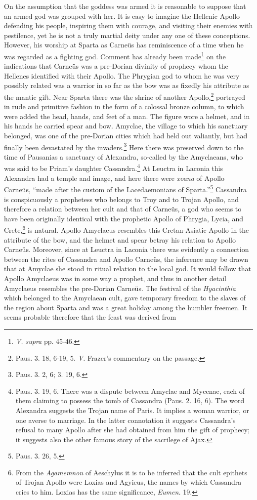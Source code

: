 \documentclass[a4paper, 12pt, oneside]{article}
\begin{document}
On the assumption that the goddess was armed it is reasonable to suppose that an armed god was grouped with her. It is easy to imagine the Hellenic Apollo defending his people, inspiring them with courage, and visiting their enemies with pestilence, yet he is not a truly martial deity under any one of these conceptions. However, his worship at Sparta as Carneüs has reminiscence of a time when he was regarded as a fighting god. Comment has already been made\footnote{\emph{V. supra} pp. 45-46.} on the indications that Carneüs was a pre-Dorian divinity of prophecy whom the Hellenes identified with their Apollo. The Phrygian god to whom he was very possibly related was a warrior in so far as the bow was as fixedly his attribute as the mantic gift. Near Sparta there was the shrine of another Apollo,\footnote{Paus. 3. 18, 6-19, 5. \emph{V.} Frazer's commentary on the passage.} portrayed in rude and primitive fashion in the form of a colossal bronze column, to which were added the head, hands, and feet of a man. The figure wore a helmet, and in his hands he carried spear and bow. Amyclae, the village to which his sanctuary belonged, was one of the pre-Dorian cities which had held out valiantly, but had finally been devastated by the invaders.\footnote{Paus. 3. 2, 6; 3. 19, 6.} Here there was preserved down to the time of Pausanias a sanctuary of Alexandra, so-called by the Amyclaeans, who was said to be Priam's daughter Cassandra.\footnote{Paus. 3. 19, 6. There was a dispute between Amyclae and Mycenae, each of them claiming to possess the tomb of Cassandra (Paus. 2. 16, 6). The word Alexandra suggests the Trojan name of Paris. It implies a woman warrior, or one averse to marriage. In the latter connotation it suggests Cassandra's refusal to many Apollo after she had obtained from him the gift of prophecy; it suggests also the other famous story of the sacrilege of Ajax.} At Leuctra in Laconia this Alexandra had a temple and image, and here there were \emph{xoana} of Apollo Carneüs, ``made after the custom of the Lacedaemonians of Sparta.''\footnote{Paus. 3. 26, 5.} Cassandra is conspicuously a prophetess who belongs to Troy and to Trojan Apollo, and therefore a relation between her cult and that of Carneüs, a god who seems to have been originally identical with the prophetic Apollo of Phrygia, Lycia, and Crete,\footnote{From the \emph{Agamemnon} of Aeschylus it is to be inferred that the cult epithets of Trojan Apollo were Loxias and Agyieus, the names by which Cassandra cries to him. Loxias has the same significance, \emph{Eumen.} 19.} is natural. Apollo Amyclaeus resembles this Cretan-Asiatic Apollo in the attribute of the bow, and the helmet and spear betray his relation to Apollo Carneüs. Moreover, since at Leuctra in Laconia there was evidently a connection between the rites of Cassandra and Apollo Carneüs, the inference may be drawn that at Amyclae she stood in ritual relation to the local god. It would follow that Apollo Amyclaeus was in some way a prophet, and thus in another detail Amyclaeus resembles the pre-Dorian Carneüs. The festival of the \emph{Hyacinthia} which belonged to the Amyclaean cult, gave temporary freedom to the slaves of the region about Sparta and was a great holiday among the humbler freemen. It seems probable therefore that the feast was derived from 
\end{document}
